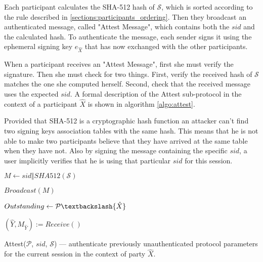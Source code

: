 Each participant calculates the SHA-512 hash of $\mathcal{S}$, which is sorted according to the rule described in \ref{sections:participants_ordering}. Then they broadcast an authenticated message, called "Attest Message", which contains both the $sid$ and the calculated hash. To authenticate the message, each sender signs it using the ephemeral signing key $e_{\hat{X}}$ that has now exchanged with the other participants.

When a participant receives an "Attest Message", first she must verify the signature. Then she must check for two things. First, verify the received hash of $\mathcal{S}$ matches the one she computed herself. Second, check that the received message uses the expected $sid$. A formal description of the Attest sub-protocol in the context of a participant $\hat{X}$ is shown in algorithm \ref{algo:attest}.

Provided that SHA-512 is a cryptographic hash function an attacker can't find two signing keys association tables with the same hash. This means that he is not able to make two participants believe that they have arrived at the same table when they have not. Also by signing the message containing the specific $sid$, a user implicitly verifies that he is using that particular $sid$ for this session.

\begin{algorithm}[H]
  \Begin
  {	
	$M \leftarrow sid \Vert SHA512(\mathcal{S})$
	
	$Broadcast(M)$
	
	$Outstanding \leftarrow \mathcal{P} \textbackslash \{\hat{X}\}$

    {
      $(\hat{Y}, M_{\hat{Y}}) := Receive()$
      
      {     
        
      }
    }

  }
  \caption{Attest($\mathcal{P}$, $sid$, $\mathcal{S}$) --- authenticate previously unauthenticated protocol parameters for the current session in the context of party $\hat{X}$.}
  \label{algo:attest}
\end{algorithm}

